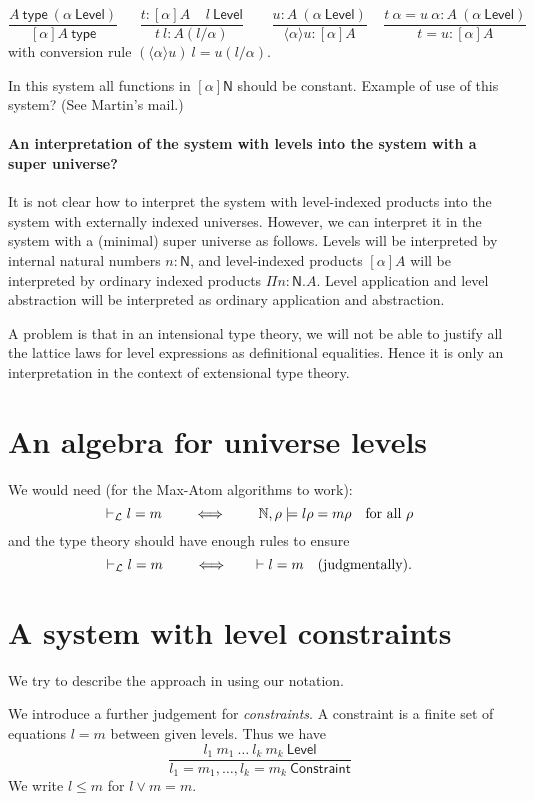 \documentclass[11pt,a4paper]{article}
\newcommand{\lam}[2]{{\langle}#1{\rangle}#2}
\def\NN{\mathsf{N}}
\def\Level{\mathsf{Level}}
\newcommand{\type}{\mathsf{type}}
\def\Constraint{\mathsf{Constraint}}
\begin{document}
$$
\frac{A~\type~(\alpha~\Level)}{[\alpha]A~\type}~~~~~~~
\frac{t:[\alpha]A~~~~~l~\Level}
     {t~l:A(l/\alpha)}~~~~~~~~~
\frac{u:A~(\alpha~\Level)}{\lam{\alpha}{u}: [\alpha]A}~~~~~
\frac{t~\alpha = u~\alpha:A~(\alpha~\Level)}{t = u:[\alpha]A}
$$
with conversion rule $(\lam{\alpha}{u})~l = u(l/\alpha)$.

In this system all functions in $[\alpha]\NN$
should be constant. Example of use of this system? (See Martin's mail.)

\paragraph{An interpretation of the system with levels into the system with a super universe?} It is not clear how to interpret the system with level-indexed products into the system with externally indexed universes. However, we can interpret it in the system with a (minimal) super universe as follows. Levels will be interpreted by internal natural numbers $n : \NN$, and level-indexed products $[\alpha]A$ will be interpreted by ordinary indexed products $\Pi n : \NN.A$. Level application and level abstraction will be interpreted as ordinary application and abstraction. 

A problem is that in an intensional type theory, we will not be able to justify all the lattice laws for level expressions as definitional equalities. Hence it is only an interpretation in the context of extensional type theory.

\section{An algebra for universe levels}

We would need (for the Max-Atom algorithms to work):
\[ 
\vdash_{\cal L} l=m  \quad \quad \iff \quad \quad \mathbb{N},\rho \models l\rho = m\rho
\text{~~ for all $\rho$}
\]
and the type theory should have enough rules to ensure
\[ 
\vdash_{\cal L} l=m  \quad \quad \iff \quad \quad \vdash l=m
\text{~~ (judgmentally)}.
\]

\section{A system with level constraints}

We try to describe the approach in \cite{VV} using our notation.

We introduce a further judgement for {\em constraints}. A constraint is
a finite set of equations $l = m$ between given levels. Thus we have
$$
\frac{l_1~m_1~\dots~l_k~m_k~\Level}{l_1 = m_1,\dots,l_k = m_k~\Constraint}
$$
We write $l\leqslant m$ for $l\vee m = m$.
\end{document}
